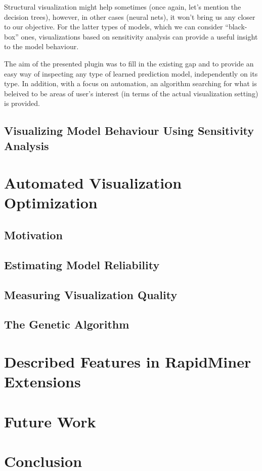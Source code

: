 \documentclass[10pt, twoside]{article}
\begin{document}
Structural visualization might help sometimes (once again, let's mention the decision trees),
however, in other cases (neural nets), it won't bring us any closer to our objective.
For the latter types of models, which we can consider ``black-box'' ones,
visualizations based on sensitivity analysis can provide a useful insight to the model behaviour.

The aim of the presented plugin was to fill in the existing gap
and to provide an easy way of inspecting any type of learned prediction model,
independently on its type.
In addition, with a focus on automation, an algorithm searching for
what is beleived to be areas of user's interest (in terms of the actual visualization setting) is provided.

\subsection{Visualizing Model Behaviour Using Sensitivity Analysis}

\section{Automated Visualization Optimization}

\subsection{Motivation}

\subsection{Estimating Model Reliability}

\subsection{Measuring Visualization Quality}

\subsection{The Genetic Algorithm}

\section{Described Features in RapidMiner Extensions}

\section{Future Work}

\section{Conclusion}
\end{document}
